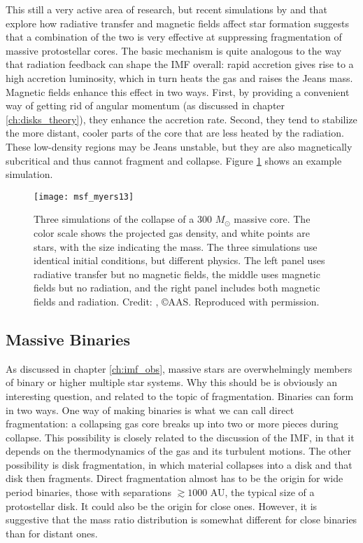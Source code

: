 This still a very active area of research, but recent simulations by \citet{commercon11c} and \citet{myers13a} that explore how radiative transfer and magnetic fields affect star formation suggests that a combination of the two is very effective at suppressing fragmentation of massive protostellar cores. The basic mechanism is quite analogous to the way that radiation feedback can shape the IMF overall: rapid accretion gives rise to a high accretion luminosity, which in turn heats the gas and raises the Jeans mass. Magnetic fields enhance this effect in two ways. First, by providing a convenient way of getting rid of angular momentum (as discussed in chapter \ref{ch:disks_theory}), they enhance the accretion rate. Second, they tend to stabilize the more distant, cooler parts of the core that are less heated by the radiation. These low-density regions may be Jeans unstable, but they are also magnetically subcritical and thus cannot fragment and collapse. Figure \ref{fig:msf_myers13} shows an example simulation.

\begin{figure}
\texttt{[image: msf\_myers13]}
\caption[Simulations of massive star formation with magnetic fields and radiation]{
\label{fig:msf_myers13}
Three simulations of the collapse of a 300 $M_\odot$ massive core. The color scale shows the projected gas density, and white points are stars, with the size indicating the mass. The three simulations use identical initial conditions, but different physics. The left panel uses radiative transfer but no magnetic fields, the middle uses magnetic fields but no radiation, and the right panel includes both magnetic fields and radiation. Credit: \citet{myers13a}, \copyright AAS. Reproduced with permission.
}
\end{figure}

\subsection{Massive Binaries}

As discussed in chapter \ref{ch:imf_obs}, massive stars are overwhelmingly members of binary or higher multiple star systems. Why this should be is obviously an interesting question, and related to the topic of fragmentation. Binaries can form in two ways. One way of making binaries is what we can call direct fragmentation: a collapsing gas core breaks up into two or more pieces during collapse. This possibility is closely related to the discussion of the IMF, in that it depends on the thermodynamics of the gas and its turbulent motions. The other possibility is disk fragmentation, in which material collapses into a disk and that disk then fragments. Direct fragmentation almost has to be the origin for wide period binaries, those with separations $\gtrsim 1000$ AU, the typical size of a protostellar disk. It could also be the origin for close ones. However, it is suggestive that the mass ratio distribution is somewhat different for close binaries than for distant ones.

